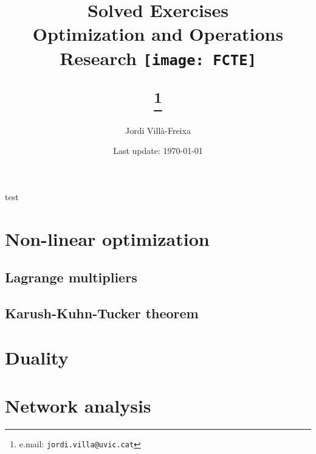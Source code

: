 \documentclass[12pt]{book}
\begin{document}


\title{Solved Exercises \\ \large Optimization and Operations Research \newline \newline \texttt{[image: FCTE]}

\thanks{e.mail: \texttt{jordi.villa@uvic.cat}}}
\author{Jordi Villà-Freixa}
\date{Last update: \today}
\maketitle
\tableofcontents
\newpage

test
\begin{ExerciseList}
\section{Non-linear optimization}
\subsection{Lagrange multipliers}

\subsection{Karush-Kuhn-Tucker theorem}

\section{Duality}


\section{Network analysis}

\end{ExerciseList}



\end{document}
